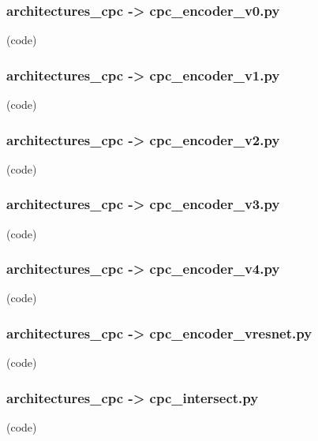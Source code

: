 \begin{myparindent}{0pt}

\noindent\subsubsection[cpc\_encoder\_v0.py]{architectures\_cpc -> cpc\_encoder\_v0.py} (code)

\noindent\subsubsection[cpc\_encoder\_v1.py]{architectures\_cpc -> cpc\_encoder\_v1.py} (code)

\noindent\subsubsection[cpc\_encoder\_v2.py]{architectures\_cpc -> cpc\_encoder\_v2.py} (code)

\noindent\subsubsection[cpc\_encoder\_v3.py]{architectures\_cpc -> cpc\_encoder\_v3.py} (code)

\noindent\subsubsection[cpc\_encoder\_v4.py]{architectures\_cpc -> cpc\_encoder\_v4.py} (code)

\noindent\subsubsection[cpc\_encoder\_vresnet.py]{architectures\_cpc -> cpc\_encoder\_vresnet.py} (code)

\noindent\subsubsection[cpc\_intersect.py]{architectures\_cpc -> cpc\_intersect.py} (code)

\end{myparindent}

